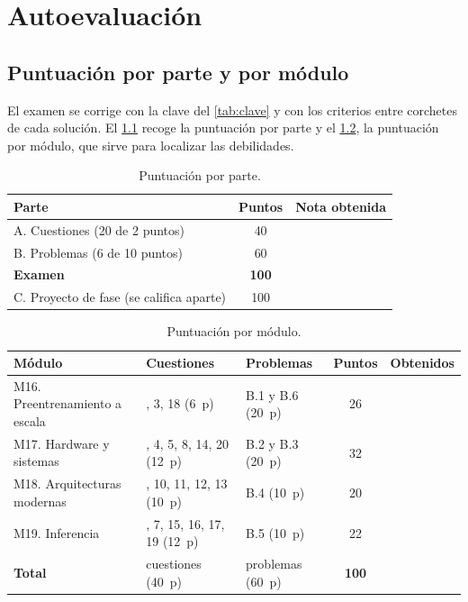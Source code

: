 \chapter{Autoevaluación}
\label{ap:autoevaluacion}

\section{Puntuación por parte y por módulo}

El examen se corrige con la clave del \cref{tab:clave} y con los criterios entre corchetes de cada solución. El \cref{tab:puntos-parte} recoge la puntuación por parte y el \cref{tab:puntos-modulo}, la puntuación por módulo, que sirve para localizar las debilidades.

\begin{table}[h]
\centering\small
\caption{Puntuación por parte.}\label{tab:puntos-parte}
\begin{tabular}{@{}lcc@{}}
\toprule
Parte & Puntos & Nota obtenida \\
\midrule
A. Cuestiones (20 de 2 puntos) & 40 & \\
B. Problemas (6 de 10 puntos) & 60 & \\
\midrule
\textbf{Examen} & \textbf{100} & \\
\midrule
C. Proyecto de fase (se califica aparte) & 100 & \\
\bottomrule
\end{tabular}
\end{table}

\begin{table}[h]
\centering\small
\caption{Puntuación por módulo.}\label{tab:puntos-modulo}
\begin{tabularx}{\textwidth}{@{}l>{\raggedright\arraybackslash}X>{\raggedright\arraybackslash}Xcc@{}}
\toprule
Módulo & Cuestiones & Problemas & Puntos & Obtenidos \\
\midrule
M16. Preentrenamiento a escala & 2, 3, 18 (6~p) & B.1 y B.6 (20~p) & 26 & \\
M17. Hardware y sistemas & 1, 4, 5, 8, 14, 20 (12~p) & B.2 y B.3 (20~p) & 32 & \\
M18. Arquitecturas modernas & 9, 10, 11, 12, 13 (10~p) & B.4 (10~p) & 20 & \\
M19. Inferencia & 6, 7, 15, 16, 17, 19 (12~p) & B.5 (10~p) & 22 & \\
\midrule
\textbf{Total} & 20 cuestiones (40~p) & 6 problemas (60~p) & \textbf{100} & \\
\bottomrule
\end{tabularx}
\end{table}

